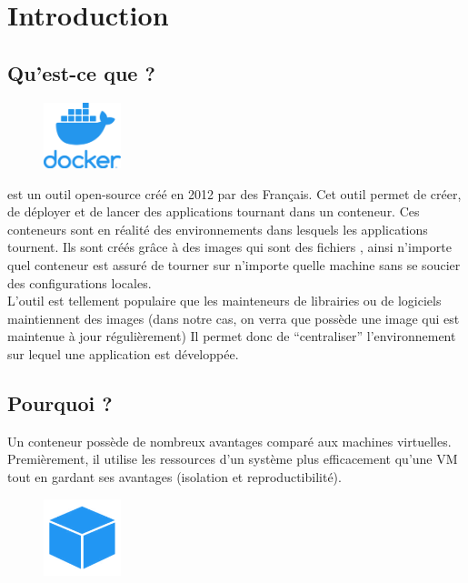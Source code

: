 \section[Introduction]{Introduction}

\subsection[Qu'est-ce que Docker?]{Qu'est-ce que \docker{}?}
    
    \begin{figure}
        \centering
        \includegraphics[width=0.2\textwidth]{Images_formation/LogoDocker.pdf}
    \end{figure}

    \docker{} est un outil open-source créé en 2012 par des Français. Cet outil permet de créer, de déployer et de lancer des applications tournant dans un conteneur. Ces conteneurs sont en réalité des environnements dans lesquels les applications tournent.
    Ils sont créés grâce à des images qui sont des fichiers \docker{}, ainsi n'importe quel conteneur est assuré de tourner sur n'importe quelle machine sans se soucier des configurations locales.\\
    L'outil est tellement populaire que les mainteneurs de librairies ou de logiciels maintiennent des images \docker{} (dans notre cas, on verra que \laravelsail{} possède une image \docker{} qui est maintenue à jour régulièrement)
    Il permet donc de ``centraliser'' l'environnement sur lequel une application est développée. 


    
\subsection[Pourquoi Docker?]{Pourquoi \docker{}?}

    Un conteneur \docker{} possède de nombreux avantages comparé aux machines virtuelles. Premièrement, il utilise les ressources d'un système plus efficacement qu'une VM tout en gardant ses avantages (isolation et reproductibilité). 

    \begin{figure}
        \centering
        \includegraphics[width=0.2\textwidth]{Images_formation/Iconconteneur.pdf}
    \end{figure}

